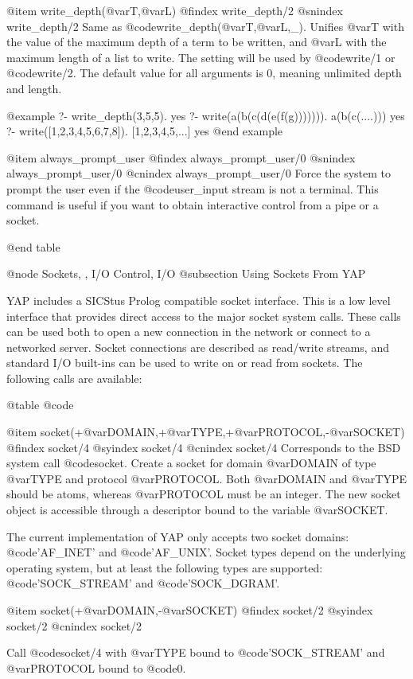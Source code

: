 {{{{{{@item write_depth(@var{T},@var{L})
@findex write_depth/2
@snindex write_depth/2
Same as @code{write_depth(@var{T},@var{L},_)}. Unifies @var{T} with the
value of the maximum depth of a term to be
written, and @var{L} with the maximum length of a list to write. The
setting will be used by @code{write/1} or @code{write/2}. The default
value for all arguments is 0, meaning unlimited depth and length.

@example
?- write_depth(3,5,5).
yes
?- write(a(b(c(d(e(f(g))))))).
a(b(c(....)))
yes
?- write([1,2,3,4,5,6,7,8]).
[1,2,3,4,5,...]
yes
@end example

@item always_prompt_user
@findex always_prompt_user/0
@snindex always_prompt_user/0
@cnindex always_prompt_user/0
Force the system to prompt the user even if the @code{user_input} stream
is not a terminal. This command is useful if you want to obtain
interactive control from a pipe or a socket.

@end table

@node Sockets, , I/O Control, I/O
@subsection Using Sockets From YAP

YAP includes a SICStus Prolog compatible socket interface. This
is a low level interface that provides direct access to the major socket
system calls. These calls can be used both to open a new connection in
the network or connect to a networked server. Socket connections are
described as read/write streams, and standard I/O built-ins can be used
to write on or read from sockets. The following calls are available:

@table @code

@item socket(+@var{DOMAIN},+@var{TYPE},+@var{PROTOCOL},-@var{SOCKET})
@findex socket/4
@syindex socket/4
@cnindex socket/4
Corresponds to the BSD system call @code{socket}. Create a socket for
domain @var{DOMAIN} of type @var{TYPE} and protocol
@var{PROTOCOL}. Both @var{DOMAIN} and @var{TYPE} should be atoms,
whereas @var{PROTOCOL} must be an integer. The new socket object is
accessible through a descriptor bound to the variable @var{SOCKET}.

The current implementation of YAP only accepts two socket
domains: @code{'AF_INET'} and @code{'AF_UNIX'}. Socket types depend on the
underlying operating system, but at least the following types are
supported: @code{'SOCK_STREAM'} and @code{'SOCK_DGRAM'}.

@item socket(+@var{DOMAIN},-@var{SOCKET})
@findex socket/2
@syindex socket/2
@cnindex socket/2

Call @code{socket/4} with @var{TYPE} bound to @code{'SOCK_STREAM'} and
@var{PROTOCOL} bound to @code{0}.

}}}}}}
